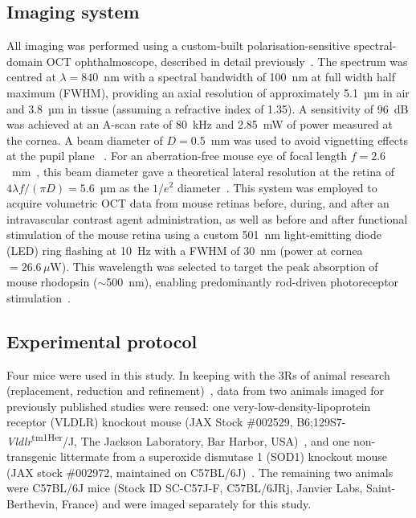 
\subsection{Imaging system}
\label{subsec:imaging_system}
All imaging was performed using a custom-built polarisation-sensitive spectral-domain OCT ophthalmoscope, described in detail previously~\cite{fialovaPolarizationPropertiesSingle2016}. The spectrum was centred at $\lambda=840$~nm with a spectral bandwidth of 100~nm at full width half maximum (FWHM), providing an axial resolution of approximately 5.1~µm in air and 3.8~µm in tissue (assuming a refractive index of 1.35). A sensitivity of 96~dB was achieved at an A-scan rate of 80~kHz and 2.85~mW of power measured at the cornea. A beam diameter of $D = 0.5$~mm was used to avoid vignetting effects at the pupil plane ~\cite{merkleHighresolutionDepthresolvedVascular2021}. For an aberration-free mouse eye of focal length $f = 2.6$~mm~\cite{gengOpticalPropertiesMouse2011,schmuckerParaxialSchematicEye2004}, this beam diameter gave a theoretical lateral resolution at the retina of $4\lambda f/(\pi D) = 5.6$~µm as the $1/e^2$ diameter~\cite{harperRetinalAnalysisMouse2020}. This system was employed to acquire volumetric OCT data from mouse retinas before, during, and after an intravascular contrast agent administration, as well as before and after functional stimulation of the mouse retina using a custom 501~nm light-emitting diode (LED) ring flashing at 10~Hz with a  FWHM of 30~nm (power at cornea~$= 26.6\,\mu\mathrm{W}$). This wavelength was selected to target the peak absorption of mouse rhodopsin ($\sim$500~nm), enabling predominantly rod-driven photoreceptor stimulation~\cite{fuPhototransductionMouseRods2007}.

\subsection{Experimental protocol}
\label{subsec:experimental_protocol}
Four mice were used in this study. In keeping with the 3Rs of animal research (replacement, reduction and refinement)~\cite{olssonProtectingAnimalsEnabling2016}, data from two animals imaged for previously published studies were reused: one very-low-density-lipoprotein receptor (VLDLR) knockout mouse (JAX Stock \#002529, B6;129S7-\textit{Vldlr}\textsuperscript{tm1Her}/J, The Jackson Laboratory, Bar Harbor, USA)~\cite{merkleHighresolutionDepthresolvedVascular2021}, and one non-transgenic littermate from a superoxide dismutase 1 (SOD1) knockout mouse (JAX stock \#002972, maintained on C57BL/6J)~\cite{augustinOpticalCoherenceTomography2020}. The remaining two animals were C57BL/6J mice (Stock ID SC-C57J-F, C57BL/6JRj, Janvier Labs, Saint-Berthevin, France) and were imaged separately for this study.

